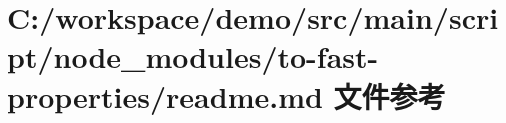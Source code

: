 \hypertarget{node__modules_2to-fast-properties_2_r_e_a_d_m_e_8md}{}\section{C\+:/workspace/demo/src/main/script/node\+\_\+modules/to-\/fast-\/properties/readme.md 文件参考}
\label{node__modules_2to-fast-properties_2_r_e_a_d_m_e_8md}
